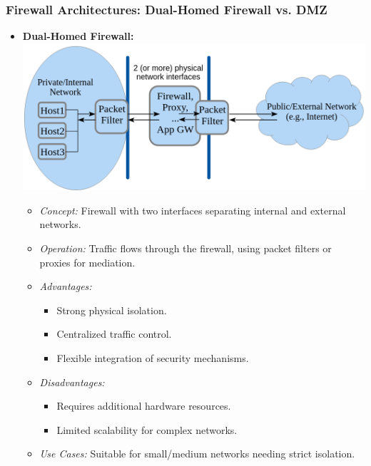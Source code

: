 \subsubsection*{Firewall Architectures: Dual-Homed Firewall vs. DMZ}
\begin{itemize}
    \item \textbf{Dual-Homed Firewall:}\\
    \includegraphics[width=0.7\columnwidth]{Resources/dual-homed.png} 
    \begin{itemize}
        \item \textit{Concept:} Firewall with two interfaces separating internal and external networks.
        \item \textit{Operation:} Traffic flows through the firewall, using packet filters or proxies for mediation.
        \item \textit{Advantages:}
        \begin{itemize}
            \item Strong physical isolation.
            \item Centralized traffic control.
            \item Flexible integration of security mechanisms.
        \end{itemize}
        \item \textit{Disadvantages:}
        \begin{itemize}
            \item Requires additional hardware resources.
            \item Limited scalability for complex networks.
        \end{itemize}
        \item \textit{Use Cases:} Suitable for small/medium networks needing strict isolation.
    \end{itemize}


\end{itemize}
